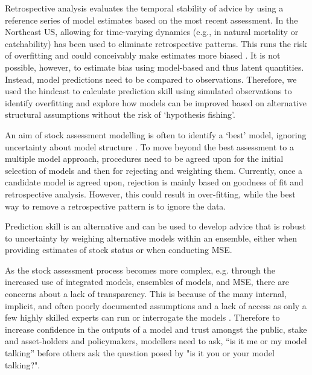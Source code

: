 \documentclass[11pt,a4paper]{article}
\begin{document}
{%
Retrospective analysis evaluates the temporal stability of advice by using a reference series of model estimates based on the most recent assessment. In the Northeast US, allowing for time-varying dynamics (e.g., in natural mortality or catchability) has been used to eliminate retrospective patterns.  This runs the risk of overfitting and could conceivably make estimates more biased \citep{brooks2016retrospective}. It is not possible, however, to estimate bias using model-based and thus latent quantities. Instead, model predictions need to be compared to observations. Therefore, we used the hindcast to calculate prediction skill using simulated observations to identify overfitting and explore how models can be improved based on alternative structural assumptions without the risk of ‘hypothesis fishing’. 

An aim of stock assessment modelling is often to identify a `best' model,  ignoring uncertainty about model structure \citep{jardim2020ensemble}. To move beyond the best assessment to a multiple model approach, procedures need to be agreed upon for the initial selection of models and then for rejecting and weighting them. Currently, once a candidate model is agreed upon, rejection is mainly based on goodness of fit and retrospective analysis. However, this could result in over-fitting, while the best way to remove a retrospective pattern is to ignore the data.
 
Prediction skill is an alternative and can be used to develop advice that is robust to uncertainty by weighing alternative models within an ensemble, either when providing estimates of stock status or when conducting MSE. 

As the stock assessment process becomes more complex, e.g. through the increased use of integrated models, ensembles of models, and MSE, there are concerns about a lack of transparency. This is because of the many internal, implicit, and often poorly documented assumptions and a lack of access as only a few highly skilled experts can run or interrogate the models \citep{hilborn2003state}. Therefore to increase confidence in the outputs of a model and trust amongst the public, stake and asset-holders and policymakers, modellers need to ask, “is it me or my model talking” before others ask the question posed by \cite{hodges1992you} "is it you or your model talking?".

}
\end{document}
